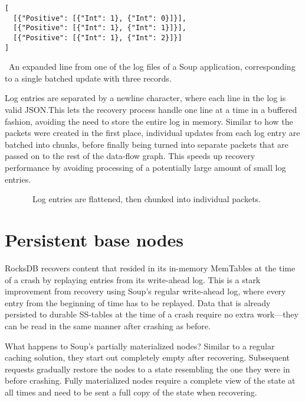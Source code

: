 \begin{listing}[H]
  \begin{verbatim}
[
  [{"Positive": [{"Int": 1}, {"Int": 0}]}],
  [{"Positive": [{"Int": 1}, {"Int": 1}]}],
  [{"Positive": [{"Int": 1}, {"Int": 2}]}]
]
  \end{verbatim}
  \caption{\
    An expanded line from one of the log files of a Soup application,
    corresponding to a single batched update with three records.
  }\label{lst:log-entry}
\end{listing}

Log entries are separated by a newline character, where each line in the log is
valid JSON.\@ This lets the recovery process handle one line at a time in a
buffered fashion, avoiding the need to store the entire log in memory. Similar
to how the packets were created in the first place, individual updates from each
log entry are batched into chunks, before finally being turned into separate
packets that are passed on to the rest of the data-flow graph. This speeds up
recovery performance by avoiding processing of a potentially large amount of
small log entries.


\begin{figure}[H]
  
  \caption{\
    Log entries are flattened, then chunked into individual packets.
  }\label{fig:log-chunking}
\end{figure}

\section{Persistent base nodes}

RocksDB recovers content that resided in its in-memory MemTables at the time of
a crash by replaying entries from its write-ahead log. This is a stark
improvement from recovery using Soup's regular write-ahead log, where every
entry from the beginning of time has to be replayed. Data that is already
persisted to durable SS-tables at the time of a crash require no extra
work---they can be read in the same manner after crashing as before.

What happens to Soup's partially materialized nodes? Similar to a regular
caching solution, they start out completely empty after recovering. Subsequent
requests gradually restore the nodes to a state resembling the one they were in
before crashing. Fully materialized nodes require a complete view of the state
at all times and need to be sent a full copy of the state when recovering.


